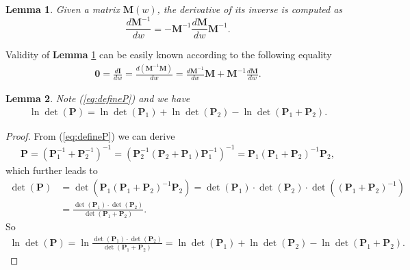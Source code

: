 \documentclass[12pt]{article}
\newtheorem{lemma}{Lemma}
\begin{document}
\begin{lemma}  \label{lm:diff_inv}
Given a matrix $\mathbf{M}(w)$, the derivative of its inverse is computed as
\begin{equation*}
\frac{d \mathbf{M}^{-1}}{dw} = -\mathbf{M}^{-1} \frac{d \mathbf{M}}{dw} \mathbf{M}^{-1}.
\end{equation*}
\end{lemma}
Validity of \textbf{Lemma} \ref{lm:diff_inv} can be easily known according to the following equality
\begin{align*}
\mathbf{0} = \frac{d \mathbf{I}}{d w} = \frac{d (\mathbf{M}^{-1} \mathbf{M})}{d w} = \frac{d \mathbf{M}^{-1}}{d w} \mathbf{M} + \mathbf{M}^{-1} \frac{d \mathbf{M}}{d w}.
\end{align*}

\begin{lemma} \label{lm:lndetP}
Note (\ref{eq:defineP}) and we have
\begin{align*}
\ln \det(\mathbf{P}) = \ln \det(\mathbf{P}_{1}) + \ln \det(\mathbf{P}_{2}) - \ln \det(\mathbf{P}_{1} + \mathbf{P}_{2}).
\end{align*}
\end{lemma}
\begin{proof}
From (\ref{eq:defineP}) we can derive
\begin{align*}
\mathbf{P} = (\mathbf{P}_{1}^{-1} + \mathbf{P}_{2}^{-1})^{-1} = (\mathbf{P}_{2}^{-1} (\mathbf{P}_{2} + \mathbf{P}_{1}) \mathbf{P}_{1}^{-1})^{-1} = \mathbf{P}_{1} (\mathbf{P}_{1} + \mathbf{P}_{2})^{-1} \mathbf{P}_{2},
\end{align*}
which further leads to
\begin{align*}
\det(\mathbf{P}) &= \det(\mathbf{P}_{1} (\mathbf{P}_{1} + \mathbf{P}_{2})^{-1} \mathbf{P}_{2}) = \det(\mathbf{P}_{1}) \cdot \det(\mathbf{P}_{2}) \cdot \det((\mathbf{P}_{1} + \mathbf{P}_{2})^{-1}) \\
  &= \frac{\det(\mathbf{P}_{1}) \cdot \det(\mathbf{P}_{2})}{\det(\mathbf{P}_{1} + \mathbf{P}_{2})}.
\end{align*}
So
\begin{align*}
\ln \det(\mathbf{P}) = \ln \frac{\det(\mathbf{P}_{1}) \cdot \det(\mathbf{P}_{2})}{\det(\mathbf{P}_{1} + \mathbf{P}_{2})} = \ln \det(\mathbf{P}_{1}) + \ln \det(\mathbf{P}_{2}) - \ln \det(\mathbf{P}_{1} + \mathbf{P}_{2}).
\end{align*}
\end{proof}
\end{document}
